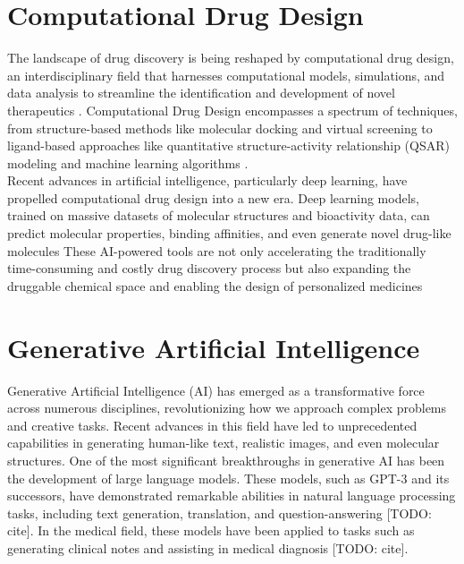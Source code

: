 \section{Computational Drug Design} 
The landscape of drug discovery is being reshaped by computational drug design, an interdisciplinary
field that harnesses computational models, simulations, and data analysis to streamline the
identification and development of novel therapeutics \cite{schneider2020rethinking}. Computational
Drug Design encompasses a spectrum of techniques, from structure-based methods like molecular
docking \cite{kitchen2004docking} and virtual screening \cite{shoichet2004virtual} to ligand-based
approaches like quantitative structure-activity relationship (QSAR) modeling
\cite{cherkasov2014qsar} and machine learning algorithms \cite{gawehn2016dl}. \\

Recent advances in artificial intelligence, particularly deep learning, have propelled computational
drug design into a new era. Deep learning models, trained on massive datasets of molecular
structures and bioactivity data, can predict molecular properties, binding affinities, and even
generate novel drug-like molecules \cite{zeng2022deep} These AI-powered tools are not only
accelerating the traditionally time-consuming and costly drug discovery process but also expanding
the druggable chemical space and enabling the design of personalized medicines \cite{gawehn2016dl}


\section{Generative Artificial Intelligence} 
Generative Artificial Intelligence (AI) has emerged as a transformative force across numerous disciplines, revolutionizing how we approach complex problems and creative tasks. Recent advances in this field have led to unprecedented capabilities in generating human-like text, realistic images, and even molecular structures. One of the most significant breakthroughs in generative AI has been the development of large language models. These models, such as GPT-3 and its successors, have demonstrated remarkable abilities in natural language processing tasks, including text generation, translation, and question-answering [TODO: cite]. In the medical field, these models have been applied to tasks such as generating clinical notes and assisting in medical diagnosis [TODO: cite]. \\

